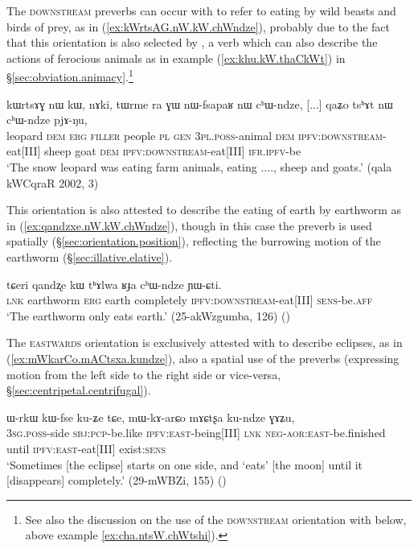 The \textsc{downstream} preverbs can occur with  to refer to eating by wild beasts and birds of prey, as in (\ref{ex:kWrtsAG.nW.kW.chWndze}), probably due to the fact that this orientation is also selected by , a verb which can also describe the actions of ferocious animals as in example (\ref{ex:khu.kW.thaCkWt}) in §\ref{sec:obviation.animacy}.\footnote{See also the discussion on the use of the \textsc{downstream} orientation with  below, above example \ref{ex:cha.ntsW.chWtshi}).}

\begin{exe}
\ex \label{ex:kWrtsAG.nW.kW.chWndze}
\gll kɯrtsɤɣ nɯ kɯ, nɤki, tɯrme ra ɣɯ nɯ-fsapaʁ nɯ cʰɯ-ndze, [...] qaʑo tsʰɤt nɯ cʰɯ-ndze pjɤ-ŋu, \\
leopard \textsc{dem} \textsc{erg} \textsc{filler} people \textsc{pl} \textsc{gen} \textsc{3pl}.\textsc{poss}-animal \textsc{dem} \textsc{ipfv}:\textsc{downstream}-eat[III] { } sheep goat \textsc{dem} \textsc{ipfv}:\textsc{downstream}-eat[III] \textsc{ifr}.\textsc{ipfv}-be \\
\glt `The snow leopard was eating farm animals, eating ...., sheep and goats.' (qala kWCqraR 2002, 3)
\end{exe}

This orientation is also attested to describe the eating of earth by earthworm as in (\ref{ex:qandzxe.nW.kW.chWndze}), though in this case the preverb is used spatially (§\ref{sec:orientation.position}), reflecting the burrowing motion of the earthworm (§\ref{sec:illative.elative}). 

\begin{exe}
\ex \label{ex:qandzxe.nW.kW.chWndze}
\gll tɕeri qandʐe kɯ tʰɤlwa ʁɟa cʰɯ-ndze ɲɯ-ɕti. \\
\textsc{lnk} earthworm \textsc{erg} earth completely \textsc{ipfv}:\textsc{downstream}-eat[III] \textsc{sens}-be.\textsc{aff} \\
\glt  `The earthworm only eats earth.' (25-akWzgumba, 126)
()
\end{exe}

The \textsc{eastwards} orientation is exclusively attested with  to describe eclipses, as in (\ref{ex:mWkarCo.mACtsxa.kundze}), also a spatial use of the preverbs (expressing motion from the left side to the right side or vice-versa, §\ref{sec:centripetal.centrifugal}).

\begin{exe}
\ex \label{ex:mWkarCo.mACtsxa.kundze}
\gll ɯ-rkɯ kɯ-fse ku-ʑe tɕe, mɯ-kɤ-arɕo mɤɕtʂa ku-ndze ɣɤʑu, \\
\textsc{3sg}.\textsc{poss}-side \textsc{sbj}:\textsc{pcp}-be.like \textsc{ipfv}:\textsc{east}-being[III] \textsc{lnk} \textsc{neg}-\textsc{aor}:\textsc{east}-be.finished until \textsc{ipfv}:\textsc{east}-eat[III] exist:\textsc{sens} \\
\glt  `Sometimes [the eclipse] starts on one side, and `eats' [the moon] until it [disappears] completely.' (29-mWBZi, 155)
()
\end{exe}

